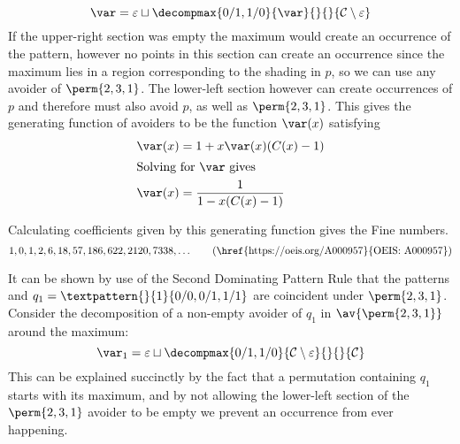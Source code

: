 \begin{equation*}
    \scriptvar = \varepsilon \sqcup
\decompmax{0/1,1/0}{\scriptvar}{}{}{\mathcal{C}\setminus\varepsilon}
\end{equation*}
If the upper-right section was empty the maximum would create an
occurrence of the pattern, however no points in this section can create
an occurrence since the maximum lies in a region corresponding to the
shading in \(p\), so we can use any avoider of \(\perm{2,3,1}\). The lower-left
section however can create occurrences
of \(p\) and therefore must also avoid \(p\), as well as \(\perm{2,3,1}\).
This gives the generating function of avoiders to be the function \(\var(x)\)
satisfying
\begin{align*}
    \var(x) &= 1 + x\var(x)(C(x)-1) \\
    \shortintertext{Solving for \(\var\) gives}
    \var(x) &= \frac{1}{1-x(C(x)-1)}
\end{align*}

\noindent
Calculating coefficients given by this generating function gives the Fine
numbers.
\begin{equation*}
    1, 0, 1, 2, 6, 18, 57, 186, 622, 2120, 7338,\dotsc
\tag{\href{https://oeis.org/A000957}{OEIS: A000957}}
\end{equation*}

\nextvar[\varfine]
It can be shown by use of the Second Dominating Pattern Rule that the patterns
 and \(q_1 = \textpattern{}{1}{0/0,0/1,1/1}\) are
coincident under \(\perm{2,3,1}\). Consider the decomposition of a non-empty
avoider of \(q_1\) in \(\av{\perm{2,3,1}}\) around the maximum:
\begin{equation*}
    \scriptvar_1 =\varepsilon \sqcup
\decompmax{0/1,1/0}{\mathcal{C}\setminus\varepsilon}{}{}{\mathcal{C}}
\end{equation*}
This can be explained succinctly by the fact that a permutation containing
\(q_1\) starts with its maximum, and by not allowing the lower-left section of the
\(\perm{2,3,1}\) avoider to be empty we prevent an occurrence from ever
happening.

